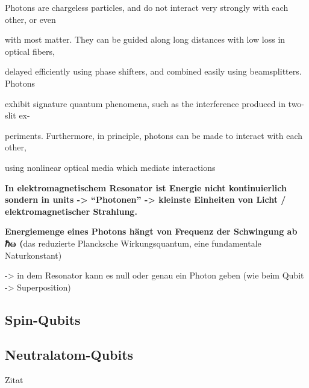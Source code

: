 Photons are chargeless particles, and do not interact very strongly with each other, or even 

with most matter. They can be guided along long distances with low loss in optical fibers, 

delayed efficiently using phase shifters, and combined easily using beamsplitters. Photons 

exhibit signature quantum phenomena, such as the interference produced in two-slit ex- 

periments. Furthermore, in principle, photons can be made to interact with each other, 

using nonlinear optical media which mediate interactions 

\textbf{In elektromagnetischem Resonator ist Energie nicht kontinuierlich sondern in units -> “Photonen” -> kleinste Einheiten von Licht / elektromagnetischer Strahlung. }

\textbf{Energiemenge eines Photons hängt von Frequenz der Schwingung ab ℏω (}das reduzierte Plancksche Wirkungsquantum, eine fundamentale Naturkonstant) 

-> in dem Resonator kann es null oder genau ein Photon geben (wie beim Qubit -> Superposition) 

 \cite{nielsen_quantum_2010}
 
\subsection{Spin-Qubits}
\subsection{Neutralatom-Qubits }



Zitat \cite{alhazmi_live_2024}

\cite{bergou_quantum_2021}

\printbibliography
